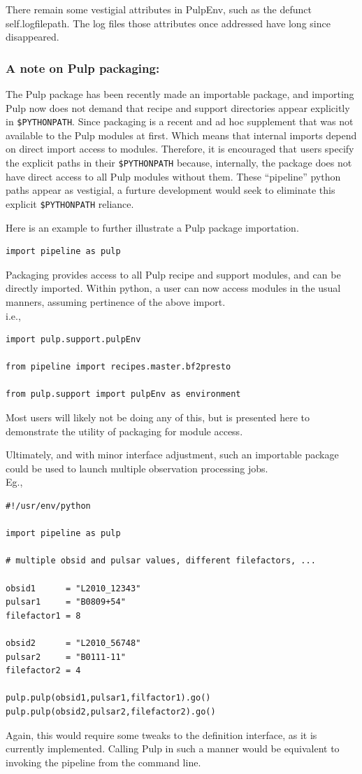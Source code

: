 \documentclass[a4paper,10pt,bibtotoc]{scrartcl}
\begin{document}
There remain some vestigial attributes in PulpEnv, such as the defunct self.logfilepath.
The log files those attributes once addressed have long since disappeared.

\subsubsection{A note on Pulp packaging:}
The Pulp package has been recently made an importable package, and importing Pulp now does not demand that recipe and support directories appear explicitly in \verb|$PYTHONPATH|.   Since packaging is a recent and ad hoc supplement  that was not available to the Pulp modules at first.  Which means that internal imports depend on direct import access to modules.  Therefore, it is encouraged that users specify the explicit paths in their  \verb|$PYTHONPATH| because, internally, the package does not have direct access to all Pulp modules without them.  These ``pipeline'' python paths appear as vestigial, a furture development would seek to eliminate this explicit \verb|$PYTHONPATH| reliance. 

Here is an example to further illustrate a Pulp package importation.

\begin{verbatim}
import pipeline as pulp
\end{verbatim}

Packaging provides access to all Pulp recipe and support modules, and can be directly imported.   Within python, a user can now access modules in the usual manners, assuming pertinence of the above import.\\
 i.e.,
\begin{verbatim}
import pulp.support.pulpEnv

from pipeline import recipes.master.bf2presto

from pulp.support import pulpEnv as environment
\end{verbatim}
Most users will likely not be doing any of this, but is presented here to demonstrate the utility of packaging for module access. 

Ultimately, and with minor interface adjustment, such an importable package could be used to launch multiple observation processing jobs. \\
 Eg.,
\begin{verbatim}
#!/usr/env/python

import pipeline as pulp

# multiple obsid and pulsar values, different filefactors, ...

obsid1      = "L2010_12343"
pulsar1     = "B0809+54"
filefactor1 = 8

obsid2      = "L2010_56748"
pulsar2     = "B0111-11"
filefactor2 = 4

pulp.pulp(obsid1,pulsar1,filfactor1).go()
pulp.pulp(obsid2,pulsar2,filefactor2).go()
\end{verbatim}
Again, this would require some tweaks to the definition interface, as
it is currently implemented. Calling Pulp in such a manner would be
equivalent to invoking the pipeline from the command line.
\end{document}
